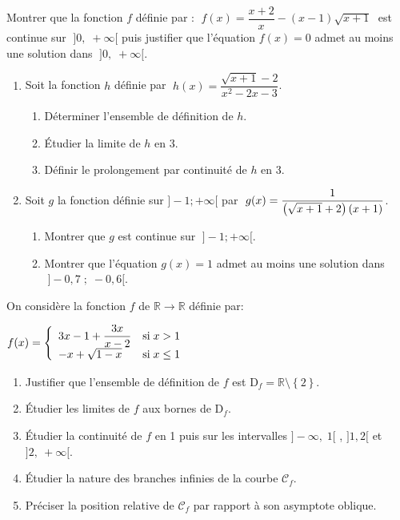 \begin{exercice}

Montrer  que  la fonction $ f $  définie par :  $\; f(x)=\dfrac{x+2}{x} -(x-1)\sqrt{x+1}\;$ est continue sur  \; $  \; ]0,\; +\infty[ $ puis justifier que l'équation $ f(x)=0 $ admet au moins une solution dans   $ \; ]0,\; +\infty[ $.
\end{exercice}
\begin{exercice}
\begin{enumerate}
\item  Soit  la fonction $ h $ définie par \; $ \; h(x)=\dfrac{\sqrt{x+1}-2}{x^2-2x-3} $.
\begin{enumerate}
\item Déterminer l'ensemble de définition de $ h $.
\item Étudier la limite de $ h $ en 3. 
\item Définir  le prolongement par continuité  de $h $  en 3.
\end{enumerate}
\item Soit $ g $ la fonction définie  sur $]-1; +\infty[$ par  $ \; g(x)=\dfrac{1}{\left(\sqrt{x+1}+2\right)\left(x+1\right)} $.
\begin{enumerate}
\item Montrer que $ g $ est continue sur \; $ \; ]-1; +\infty[$.
\item Montrer que l'équation $ g(x)=1 $ admet au moins une solution dans \; $ \; ]-0,7\;  ; \; -0,6[ $. 
\end{enumerate}
\end{enumerate}
\end{exercice}
\begin{exercice}
On considère la fonction $ f $ de $ \mathbb{R} \longrightarrow  \mathbb{R}  $ définie par:

	$f(x)= \left\{\begin{array}{l c l}
 3x-1+\dfrac{3x}{x-2}  &  \text{si}\; x > 1\\ 	 
  -x+\sqrt{1-x} & \text{si} \; x\leq 1 
\end{array}\right. $
	\begin{enumerate}
	\item Justifier que  l'ensemble de définition de $ f $ est $ \text{D}_f=\mathbb{R}\setminus\left\{2\right\} $.
	\item Étudier les limites de $ f $ aux  bornes de D$ _{f} $.
\item Étudier la continuité de  $ f $ en 1 puis sur les intervalles $ ]-\infty, \;1[ $ ,  $ ]1, 2[$  et  $ ]2, \:+\infty[$. 
	\item Étudier la nature des branches infinies de  la courbe $ \mathcal{C}_{f} $. 
	\item Préciser la position relative de $ \mathcal{C}_{f} $  par rapport à son asymptote oblique.
	\end{enumerate}
\end{exercice}


